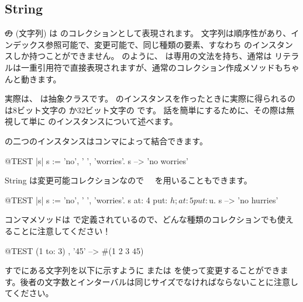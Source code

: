 \documentclass[a4paper,10pt,twoside]{book}
\begin{document}
\subsection{String}
\st の (文字列) は  のコレクションとして表現されます。
文字列は順序性があり、インデックス参照可能で、変更可能で、同じ種類の要素、すなわち  のインスタンスしか持つことができません。
 のように、 は専用の文法を持ち、通常は  リテラルは一重引用符で直接表現されますが、通常のコレクション作成メソッドもちゃんと動きます。


実際は、 は抽象クラスです。
 のインスタンスを作ったときに実際に得られるのは8ビット文字の  か32ビット文字の  です。
話を簡単にするために、その際は無視して単に  のインスタンスについて述べます。

 の二つのインスタンスはコンマによって結合できます。
\begin{code}{@TEST |s|}
s := 'no', ' ', 'worries'.
s -->  'no worries'
\end{code}

String は変更可能コレクションなので　 を用いることもできます。

\begin{code}{@TEST |s| s := 'no', ' ', 'worries'.}
s at: 4 put: $h; at: 5 put: $u.
s --> 'no hurries'
\end{code}

コンマメソッドは  で定義されているので、どんな種類のコレクションでも使えることに注意してください！
\begin{code}{@TEST}
(1 to: 3) , '45' --> #(1 2 3 $4 $5)
\end{code}

すでにある文字列を以下に示すように  または  を使って変更することができます。後者の文字数とインターバルは同じサイズでなければならないことに注意してください。
\end{document}

